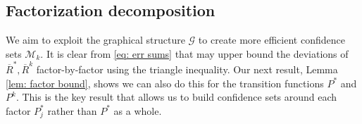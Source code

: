 \documentclass{article}
\newcommand{\Gc}{\mathcal{G}}
\newcommand{\Mc}{\mathcal{M}}
\begin{document}
\subsection{Factorization decomposition}

We aim to exploit the graphical structure $\Gc$ to create more efficient confidence sets $\Mc_k$.
It is clear from \eqref{eq: err sums} that may upper bound the deviations of $\overline{R}^*,\overline{R}^k$ factor-by-factor using the triangle inequality.
Our next result, Lemma \ref{lem: factor bound}, shows we can also do this for the transition functions $P^*$ and $P^k$.
This is the key result that allows us to build confidence sets around each factor $P^*_j$ rather than $P^*$ as a whole.
\end{document}
